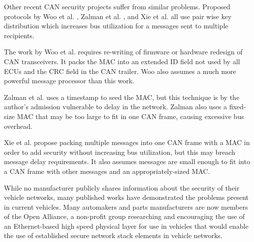 Other recent CAN security projects suffer from similar problems. Proposed protocols by Woo et al. \cite{Woo-14}, Zalman et al. \cite{Zalman-14}, and Xie et al. \cite{Xie-15} all use pair wise key distribution which increases bus utilization for a messages sent to multiple recipients.

The work by Woo et al. requires re-writing of firmware or hardware redesign of CAN transceivers. It packs the MAC into an extended ID field not used by all ECUs and the CRC field in the CAN trailer. Woo also assumes a much more powerful message processor than this work.

Zalman et al. uses a timestamp to seed the MAC, but this technique is by the author's admission vulnerable to delay in the network. Zalman also uses a fixed-size MAC that may be too large to fit in one CAN frame, causing excessive bus overhead.

Xie et al. propose packing multiple messages into one CAN frame with a MAC in order to add security without increasing bus utilization, but this may breach message delay requirements. It also assumes messages are small enough to fit into a CAN frame with other messages and an appropriately-sized MAC.

While no manufacturer publicly shares information about the security of their vehicle networks, many published works have demonstrated the problems present in current vehicles. Many automakers and parts manufacturers are now members of the Open Alliance, a non-profit group researching and encouraging the use of an Ethernet-based high speed physical layer for use in vehicles that would enable the use of established secure network stack elements in vehicle networks.